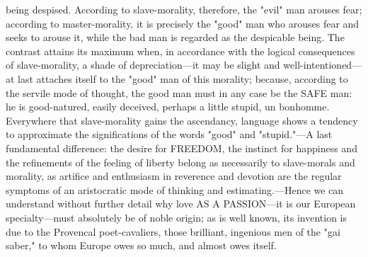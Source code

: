 \documentclass[12pt]{article}
\begin{document}
being despised. According to slave-morality, therefore, the "evil" man arouses fear; according to master-morality, it is precisely the "good" man who arouses fear and seeks to arouse it, while the bad man is regarded as the despicable being. The contrast attains its maximum when, in accordance with the logical consequences of slave-morality, a shade of depreciation---it may be slight and well-intentioned---at last attaches itself to the "good" man of this morality; because, according to the servile mode of thought, the good man must in any case be the SAFE man: he is good-natured, easily deceived, perhaps a little stupid, un bonhomme. Everywhere that slave-morality gains the ascendancy, language shows a tendency to approximate the significations of the words "good" and "stupid."---A last fundamental difference: the desire for FREEDOM, the instinct for happiness and the refinements of the feeling of liberty belong as necessarily to slave-morals and morality, as artifice and enthusiasm in reverence and devotion are the regular symptoms of an aristocratic mode of thinking and estimating.---Hence we can understand without further detail why love AS A PASSION---it is our European specialty---must absolutely be of noble origin; as is well known, its invention is due to the Provencal poet-cavaliers, those brilliant, ingenious men of the "gai saber," to whom Europe owes so much, and almost owes itself.
\end{document}
